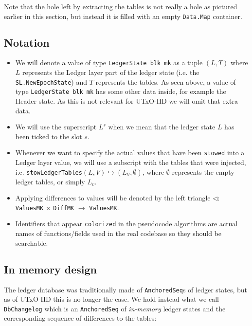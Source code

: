 \documentclass[11pt,a4paper]{article}
\newcommand{\htt}[1]{\texttt{#1}}
\theoremstyle{definition}
\begin{document}
Note that the hole left by extracting the tables is not really a hole as
pictured earlier in this section, but instead it is filled with an empty
\texttt{Data.Map} container.

\subsection{Notation}

\begin{itemize}
  \item We will denote a value of type \htt{LedgerState blk mk} as a tuple
        $(L, T)$ where $L$ represents the Ledger layer part of the ledger state
        (i.e. the \htt{SL.NewEpochState}) and $T$ represents the tables. As
        seen above, a value of type \htt{LedgerState blk mk} has some other
        data inside, for example the Header state. As this is not relevant for
        UTxO-HD we will omit that extra data.

  \item We will use the superscript $L^{s}$ when we mean that the ledger state
        $L$ has been ticked to the slot $s$.

  \item Whenever we want to specify the actual values that have been
        \texttt{stowed} into a Ledger layer value, we will use a subscript with
        the tables that were injected, i.e.
        \htt{stowLedgerTables}$(L, V) \hookrightarrow (L_{V}, \emptyset)$, where
        $\emptyset$ represents the empty ledger tables, or simply $L_{v}$.

  \item Applying differences to values will be denoted by the left triangle
        $\triangleleft : $ \htt{ValuesMK} $\times$ \htt{DiffMK} $\rightarrow$ \htt{ValuesMK}.

  \item Identifiers that appear \htt{colorized} in the pseudocode algorithms are
        actual names of functions/fields used in the real codebase so they
        should be searchable.
\end{itemize}

\subsection{In memory design}

The ledger database was traditionally made of \texttt{AnchoredSeq}s of ledger
states, but as of UTxO-HD this is no longer the case. We hold instead what we
call \htt{DbChangelog} which is an \htt{AnchoredSeq} of \emph{in-memory}
ledger states and the corresponding sequence of differences to the tables:
\end{document}
